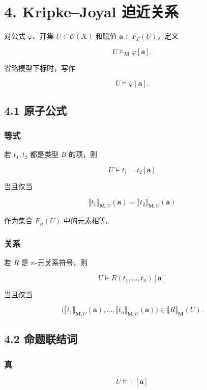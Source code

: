 \documentclass{ctexart}
\begin{document}
\section*{4. Kripke--Joyal 迫近关系}

对公式 $\varphi$、开集 $U\in\mathcal O(X)$ 和赋值 $\mathbf a\in F_\Gamma(U)$，定义

\[
U\models_{\mathbf M}\varphi[\mathbf a].
\]

省略模型下标时，写作

\[
U\models\varphi[\mathbf a].
\]

\subsection*{4.1 原子公式}

\subsubsection*{等式}

若 $t_1,t_2$ 都是类型 $B$ 的项，则

\[
U\models t_1=t_2[\mathbf a]
\]

当且仅当

\[
\llbracket t_1\rrbracket_{\mathbf M,U}(\mathbf a)
=
\llbracket t_2\rrbracket_{\mathbf M,U}(\mathbf a)
\]

作为集合 $F_B(U)$ 中的元素相等。

\subsubsection*{关系}

若 $R$ 是 $n$-元关系符号，则

\[
U\models R(t_1,\ldots,t_n)[\mathbf a]
\]

当且仅当

\[
\bigl(
\llbracket t_1\rrbracket_{\mathbf M,U}(\mathbf a),
\ldots,
\llbracket t_n\rrbracket_{\mathbf M,U}(\mathbf a)
\bigr)
\in
\llbracket R\rrbracket_{\mathbf M}(U).
\]

\subsection*{4.2 命题联结词}

\subsubsection*{真}

\[
U\models\top[\mathbf a]
\]
\end{document}

